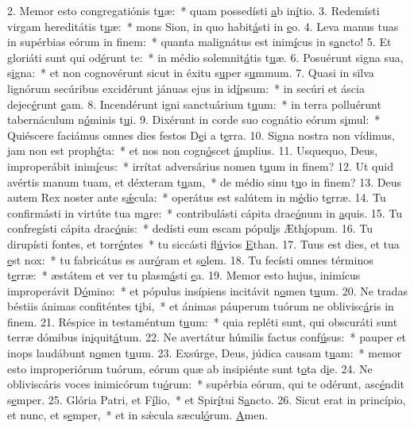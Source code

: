 2. Memor esto congregatiónis t\uline{u}æ:~* quam possedísti \uline{a}b in\uline{í}tio.
3. Redemísti virgam hereditátis t\uline{u}æ:~* mons Sion, in quo habit\uline{á}sti in \uline{e}o.
4. Leva manus tuas in supérbias eórum in f\uline{i}nem:~* quanta malignátus est inim\uline{í}cus in s\uline{a}ncto!
5. Et gloriáti sunt qui od\uline{é}runt te:~* in médio solemnit\uline{á}tis t\uline{u}æ.
6. Posuérunt signa sua, s\uline{i}gna:~* et non cognovérunt sicut in éxitu s\uline{u}per s\uline{u}mmum.
7. Quasi in silva lignórum secúribus excidérunt jánuas ejus in id\uline{í}psum:~* in secúri et áscia dejec\uline{é}runt \uline{e}am.
8. Incendérunt igni sanctuárium t\uline{u}um:~* in terra polluérunt tabernáculum n\uline{ó}minis t\uline{u}i.
9. Dixérunt in corde suo cognátio eórum s\uline{i}mul:~* Quiéscere faciámus omnes dies festos D\uline{e}i a t\uline{e}rra.
10. Signa nostra non vídimus, jam non est proph\uline{é}ta:~* et nos non cogn\uline{ó}scet \uline{á}mplius.
11. Usquequo, Deus, improperábit inim\uline{í}cus:~* irrítat adversárius nomen t\uline{u}um in f\uline{i}nem?
12. Ut quid avértis manum tuam, et déxteram t\uline{u}am,~* de médio sinu t\uline{u}o in f\uline{i}nem?
13. Deus autem Rex noster ante s\uline{ǽ}cula:~* operátus est salútem in m\uline{é}dio t\uline{e}rræ.
14. Tu confirmásti in virtúte tua m\uline{a}re:~* contribulásti cápita drac\uline{ó}num in \uline{a}quis.
15. Tu confregísti cápita drac\uline{ó}nis:~* dedísti eum escam pópul\uline{i}s Æth\uline{í}opum.
16. Tu dirupísti fontes, et torr\uline{é}ntes~* tu siccásti fl\uline{ú}vios \uline{E}than.
17. Tuus est dies, et tua \uline{e}st nox:~* tu fabricátus es aur\uline{ó}ram et s\uline{o}lem.
18. Tu fecísti omnes términos t\uline{e}rræ:~* æstátem et ver tu plasm\uline{á}sti \uline{e}a.
19. Memor esto hujus, inimícus improperávit D\uline{ó}mino:~* et pópulus insípiens incitávit n\uline{o}men t\uline{u}um.
20. Ne tradas béstiis ánimas confiténtes t\uline{i}bi,~* et ánimas páuperum tuórum ne oblivisc\uline{á}ris in f\uline{i}nem.
21. Réspice in testaméntum t\uline{u}um:~* quia repléti sunt, qui obscuráti sunt terræ dómibus in\uline{i}quit\uline{á}tum.
22. Ne avertátur húmilis factus conf\uline{ú}sus:~* pauper et inops laudábunt n\uline{o}men t\uline{u}um.
23. Exsúrge, Deus, júdica causam t\uline{u}am:~* memor esto improperiórum tuórum, eórum quæ ab insipiénte sunt t\uline{o}ta d\uline{i}e.
24. Ne obliviscáris voces inimicórum tu\uline{ó}rum:~* supérbia eórum, qui te odérunt, asc\uline{é}ndit s\uline{e}mper.
25. Glória Patri, et F\uline{í}lio,~* et Spir\uline{í}tui S\uline{a}ncto.
26. Sicut erat in princípio, et nunc, et s\uline{e}mper,~* et in sǽcula sæcul\uline{ó}rum. \uline{A}men.
